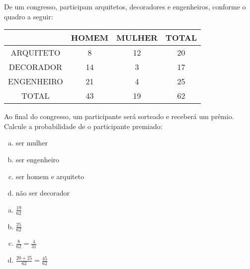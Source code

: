 \begin{ex}
De um congresso, participam arquitetos, decoradores e engenheiros, conforme o quadro a seguir:
\begin{center}
\begin{tabular}{|c|c|c|c|} \hline
& HOMEM & MULHER & TOTAL  \\ \hline
ARQUITETO & 8 & 12 & 20 \\  \hline
DECORADOR & 14 & 3 & 17 \\  \hline
ENGENHEIRO & 21 & 4 & 25 \\ \hline
TOTAL & 43 & 19 &  62 \\ \hline
\end{tabular}
\end{center}
Ao final do congresso, um  participante será sorteado e receberá um prêmio. Calcule a probabilidade de o participante premiado:
   \begin{enumerate}[(a)]
   \item ser mulher
   \item ser engenheiro
   \item ser homem e arquiteto
   \item não ser decorador
   \end{enumerate}
     \begin{sol}
       \phantom{A}
         \begin{enumerate} [(a)]
             \item $\frac{19}{62}$
             \item $\frac{25}{62}$
             \item $\frac{8}{62}=\frac{4}{31}$
             \item $\frac{20+25}{62}=\frac{45}{62}$
             
         \end{enumerate}
     \end{sol}
\end{ex}